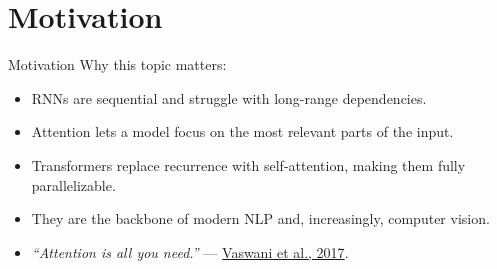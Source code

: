 \section{Motivation}
\begin{frame}{Motivation}
    \large Why this topic matters:
        \begin{itemize}
            \item RNNs are sequential and struggle with long-range dependencies.
            \item Attention lets a model focus on the most relevant parts of the input.
            \item Transformers replace recurrence with self-attention, making them fully parallelizable.
            \item They are the backbone of modern NLP and, increasingly, computer vision.
            \item \textit{``Attention is all you need.''} --- \href{https://arxiv.org/abs/1706.03762}{Vaswani et al., 2017}.
        \end{itemize}
\end{frame}
